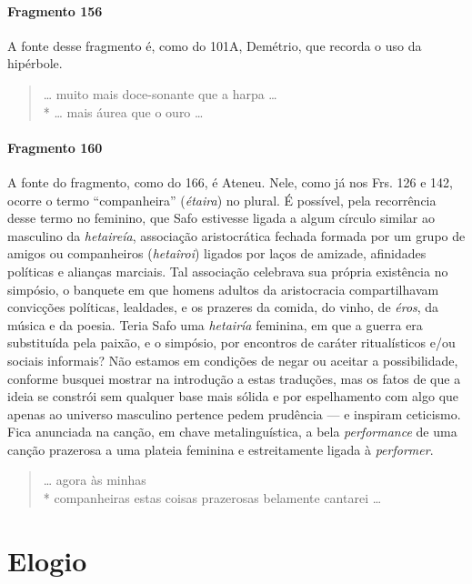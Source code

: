 \paragraph{Fragmento 156}

{\small A fonte desse fragmento é, como do 101A, Demétrio, que recorda o uso da
hipérbole.}

\begin{verse}
\ldots{} muito mais doce-sonante que a harpa \ldots{}\\*
\ldots{} mais áurea que o ouro \ldots{}
\end{verse}

\paragraph{Fragmento 160}

{\small A fonte do fragmento, como do 166, é Ateneu. Nele, como já nos Frs.
126 e 142, ocorre o termo ``companheira” (\textit{étaira}) no plural. É
possível, pela recorrência desse termo no feminino, que Safo estivesse ligada a
algum círculo similar ao masculino da \textit{hetaireía}, associação
aristocrática fechada formada por um grupo de amigos ou companheiros
(\textit{hetaîroi}) ligados por laços de amizade, afinidades políticas e
alianças marciais. Tal associação celebrava sua própria existência no simpósio,
o banquete em que homens adultos da aristocracia compartilhavam convicções
políticas, lealdades, e os prazeres da comida, do vinho, de \textit{éros}, da música e 
da poesia. Teria Safo uma \textit{hetairía }feminina, em que a guerra era substituída pela
paixão, e o simpósio, por encontros de caráter ritualísticos e/ou sociais
informais? Não estamos em condições de negar ou aceitar a possibilidade,
conforme busquei mostrar na introdução a estas traduções, mas os fatos de que a
ideia se constrói sem qualquer base mais sólida e por espelhamento com algo que
apenas ao universo masculino pertence pedem prudência --- e inspiram ceticismo.
Fica anunciada na canção, em chave metalinguística, a bela \textit{performance}
de uma canção prazerosa a uma plateia feminina e estreitamente ligada à
\textit{performer}.}

\begin{verse}
\ldots{} agora às minhas\\*
companheiras estas coisas prazerosas belamente cantarei \ldots{}
\end{verse}


\section{Elogio}

